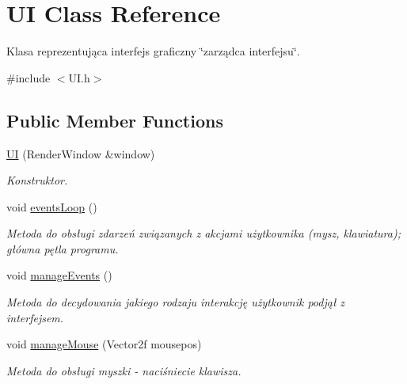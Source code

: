 \hypertarget{class_u_i}{}\section{UI Class Reference}
\label{class_u_i}


Klasa reprezentująca interfejs graficzny \char`\"{}zarządca interfejsu\char`\"{}.  




{\ttfamily \#include $<$U\+I.\+h$>$}

\subsection*{Public Member Functions}
\begin{DoxyCompactItemize}
\item 
\mbox{\hyperlink{class_u_i_afbd1850b7e5e8627a0d5f3897cf65bea}{UI}} (Render\+Window \&window)
\begin{DoxyCompactList}\small\item\em Konstruktor. \end{DoxyCompactList}\item 
\mbox{\label{class_u_i_afe0e8097637af0f8898b0ffbba871bcb}} 
void \mbox{\hyperlink{class_u_i_afe0e8097637af0f8898b0ffbba871bcb}{events\+Loop}} ()
\begin{DoxyCompactList}\small\item\em Metoda do obsługi zdarzeń związanych z akcjami użytkownika (mysz, klawiatura); główna pętla programu. \end{DoxyCompactList}\item 
\mbox{\label{class_u_i_a0135d8335faa33e407519db4b723d636}} 
void \mbox{\hyperlink{class_u_i_a0135d8335faa33e407519db4b723d636}{manage\+Events}} ()
\begin{DoxyCompactList}\small\item\em Metoda do decydowania jakiego rodzaju interakcję użytkownik podjął z interfejsem. \end{DoxyCompactList}\item 
void \mbox{\hyperlink{class_u_i_a132cf813c56c65d3756dc136b021de1c}{manage\+Mouse}} (Vector2f mousepos)
\begin{DoxyCompactList}\small\item\em Metoda do obsługi myszki -\/ naciśniecie klawisza. \end{DoxyCompactList}\item 

\end{DoxyCompactItemize}
